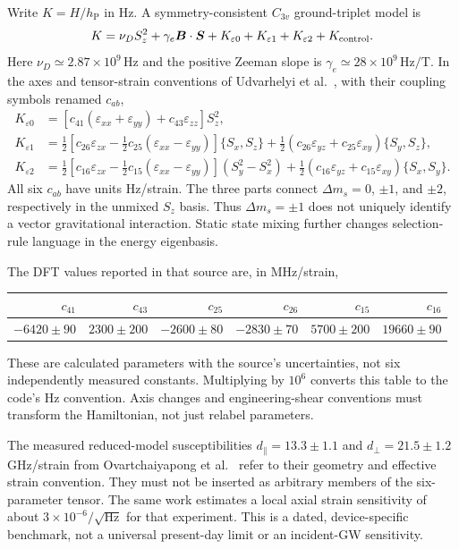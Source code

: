 \documentclass[a4paper,11pt]{article}
\newcommand{\ac}[2]{\{#1,#2\}}
\newcommand{\hp}{h_{\mathrm P}}
\newcommand{\eps}{\varepsilon}
\begin{document}
Write $K=H/\hp$ in Hz. A symmetry-consistent $C_{3v}$ ground-triplet model is
\begin{equation}
 K=\nu_DS_z^2+\gamma_e\bm B\cdot\bm S+K_{\eps0}+K_{\eps1}+K_{\eps2}+K_{\rm control}.
 \label{eq:nv}
\end{equation}
Here $\nu_D\simeq2.87\times10^9\,\mathrm{Hz}$ and the positive Zeeman slope is $\gamma_e\simeq28\times10^9\,\mathrm{Hz/T}$. In the axes and tensor-strain conventions of Udvarhelyi et al.~\cite{udvarhelyi}, with their coupling symbols renamed $c_{ab}$,
\begin{align}
 K_{\eps0}&=[c_{41}(\eps_{xx}+\eps_{yy})+c_{43}\eps_{zz}]S_z^2,\\
 K_{\eps1}&=\tfrac12[c_{26}\eps_{zx}-\tfrac12c_{25}(\eps_{xx}-\eps_{yy})]\ac{S_x}{S_z}
 +\tfrac12(c_{26}\eps_{yz}+c_{25}\eps_{xy})\ac{S_y}{S_z},\\
 K_{\eps2}&=\tfrac12[c_{16}\eps_{zx}-\tfrac12c_{15}(\eps_{xx}-\eps_{yy})](S_y^2-S_x^2)
 +\tfrac12(c_{16}\eps_{yz}+c_{15}\eps_{xy})\ac{S_x}{S_y}.
 \label{eq:fullstrain}
\end{align}
All six $c_{ab}$ have units Hz/strain. The three parts connect $\Delta m_s=0$, $\pm1$, and $\pm2$, respectively in the unmixed $S_z$ basis. Thus $\Delta m_s=\pm1$ does not uniquely identify a vector gravitational interaction. Static state mixing further changes selection-rule language in the energy eigenbasis.

The DFT values reported in that source are, in MHz/strain,
\begin{center}
\begin{tabular}{@{}rrrrrr@{}}\toprule
$c_{41}$&$c_{43}$&$c_{25}$&$c_{26}$&$c_{15}$&$c_{16}$\\\midrule
$-6420\pm90$&$2300\pm200$&$-2600\pm80$&$-2830\pm70$&$5700\pm200$&$19660\pm90$\\\bottomrule
\end{tabular}
\end{center}
These are calculated parameters with the source's uncertainties, not six independently measured constants. Multiplying by $10^6$ converts this table to the code's Hz convention. Axis changes and engineering-shear conventions must transform the Hamiltonian, not just relabel parameters.

The measured reduced-model susceptibilities $d_\parallel=13.3\pm1.1$ and $d_\perp=21.5\pm1.2$ GHz/strain from Ovartchaiyapong et al.~\cite{ovart} refer to their geometry and effective strain convention. They must not be inserted as arbitrary members of the six-parameter tensor. The same work estimates a local axial strain sensitivity of about $3\times10^{-6}/\sqrt{\mathrm{Hz}}$ for that experiment. This is a dated, device-specific benchmark, not a universal present-day limit or an incident-GW sensitivity.
\end{document}
